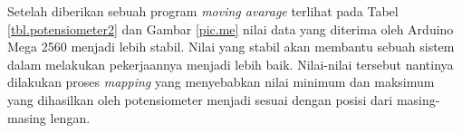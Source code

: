 \begin{table}[H]
	\centering
	\caption{Hasil Pengujian Potensiometer Menggunakan Program \textit{Moving Avarage}}
	\label{tbl.potensiometer2}
	
\end{table} 


Setelah diberikan sebuah program \textit{moving avarage} terlihat pada Tabel \ref{tbl.potensiometer2} dan Gambar \ref{pic.me} nilai data yang diterima oleh Arduino Mega 2560 menjadi lebih stabil. Nilai yang stabil akan membantu sebuah sistem dalam melakukan pekerjaannya menjadi lebih baik. Nilai-nilai tersebut nantinya dilakukan proses \textit{mapping} yang menyebabkan nilai minimum dan maksimum yang dihasilkan oleh potensiometer menjadi sesuai dengan posisi dari masing-masing lengan.

